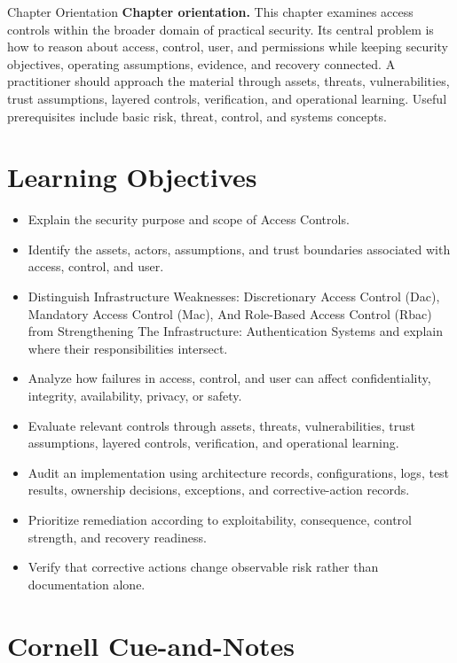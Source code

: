 \documentclass[11pt,letterpaper]{article}
\title{\CornellDocumentTitle}
\author{}
\date{}
\begin{document}
\maketitle
\begin{CornellOverviewBox}{Chapter Orientation}
\textbf{Chapter orientation.} This chapter examines access controls within the broader domain of practical security. Its central problem is how to reason about access, control, user, and permissions while keeping security objectives, operating assumptions, evidence, and recovery connected. A practitioner should approach the material through assets, threats, vulnerabilities, trust assumptions, layered controls, verification, and operational learning. Useful prerequisites include basic risk, threat, control, and systems concepts.
\end{CornellOverviewBox}
\section*{Learning Objectives}
\begin{itemize}
\item Explain the security purpose and scope of Access Controls.
\item Identify the assets, actors, assumptions, and trust boundaries associated with access, control, and user.
\item Distinguish Infrastructure Weaknesses: Discretionary Access Control (Dac), Mandatory Access Control (Mac), And Role-Based Access Control (Rbac) from Strengthening The Infrastructure: Authentication Systems and explain where their responsibilities intersect.
\item Analyze how failures in access, control, and user can affect confidentiality, integrity, availability, privacy, or safety.
\item Evaluate relevant controls through assets, threats, vulnerabilities, trust assumptions, layered controls, verification, and operational learning.
\item Audit an implementation using architecture records, configurations, logs, test results, ownership decisions, exceptions, and corrective-action records.
\item Prioritize remediation according to exploitability, consequence, control strength, and recovery readiness.
\item Verify that corrective actions change observable risk rather than documentation alone.
\end{itemize}
\section*{Cornell Cue-and-Notes}
\end{document}

